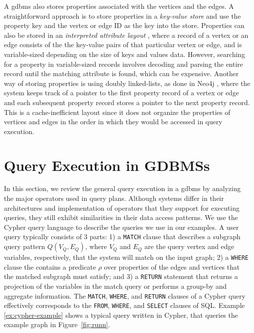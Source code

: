A \gls{gdbms} also stores properties associated with the vertices and the edges. A straightforward approach is to store properties in a \emph{key-value store} \cite{dgraph} and use the property key and the vertex or edge ID as the key into the store. Properties can also be stored in an \emph{interpreted attribute layout} \cite{beckmann:sparse}, where a record of a vertex or an edge consists of the the key-value pairs of that particular vertex or edge, and is variable-sized depending on the size of keys and values data. However, searching for a property in variable-sized records involves decoding and parsing the entire record until the matching attribute is found, which can be expensive. Another way of storing properties is using doubly linked-lists, as done in Neo4j \cite{neo4j}, where the system keeps track of a pointer to the first property record of a vertex or edge and each subsequent property record stores a pointer to the next property record. This is a cache-inefficient layout since it does not organize the properties of vertices and edges in the order in which they would be accessed in query execution. 

\section{Query Execution in GDBMSs}
\label{sec:operators}

In this section, we review the general query execution in a \gls{gdbms} by analyzing the major operators used in query plans. Although systems differ in their architectures and implementation of operators that they support for executing queries, they still exhibit similarities in their data access patterns. We use the Cypher query language \cite{cypher} to describe the queries we use in our examples. A user query typically consists of 3 parts: 1) a \texttt{MATCH} clause that describes a subgraph query pattern $Q(V_Q, E_Q)$, where $V_Q$ and $E_Q$ are the query vertex and edge variables, respectively, that the system will match on the input graph; 2) a \texttt{WHERE} clause the contains a predicate $\rho$ over properties of the edges and vertices that the matched subgraph must satisfy; and 3) a \texttt{RETURN} statement that returns a projection of the variables in the match query or performs a group-by and aggregate information. The \texttt{MATCH}, \texttt{WHERE}, and \texttt{RETURN} clauses of a Cypher query effectively corresponds to the \texttt{FROM}, \texttt{WHERE}, and \texttt{SELECT} clauses of SQL. Example \ref{ex:cypher-example} shows a typical query written in Cypher, that queries the example graph in Figure~\ref{fig:runn}.

